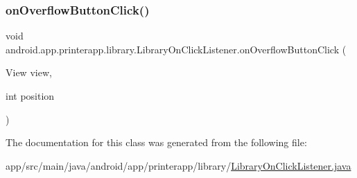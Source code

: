 \subsubsection{\texorpdfstring{on\+Overflow\+Button\+Click()}{onOverflowButtonClick()}}
{\footnotesize\ttfamily void android.\+app.\+printerapp.\+library.\+Library\+On\+Click\+Listener.\+on\+Overflow\+Button\+Click (\begin{DoxyParamCaption}\item[{View}]{view,  }\item[{int}]{position }\end{DoxyParamCaption})}



The documentation for this class was generated from the following file\+:\begin{DoxyCompactItemize}
\item 
app/src/main/java/android/app/printerapp/library/\hyperlink{_library_on_click_listener_8java}{Library\+On\+Click\+Listener.\+java}\end{DoxyCompactItemize}

